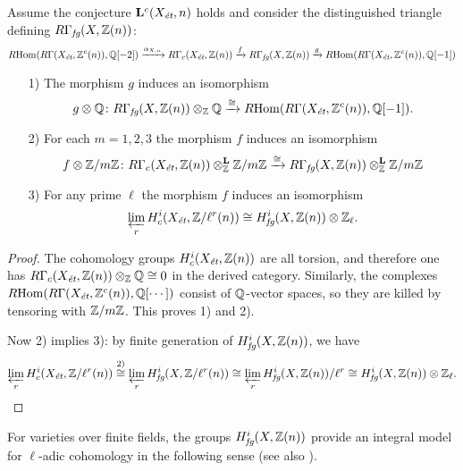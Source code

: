 \documentclass{article}
\numberwithin{equation}{section}
\begin{document}
\begin{proposition}
  \label{prop:tensoring-RGammafg-with-Z/m-and-Q}
  Assume the conjecture $\mathbf{L}^c (X_\et,n)$ holds and consider the
  distinguished triangle defining $R\Gamma_\fg (X, \ZZ (n))$:
  \[ \RHom (R\Gamma (X_\et, \ZZ^c (n)), \QQ [-2]) \xrightarrow{\alpha_{X,n}}
     R\Gamma_c (X_\et, \ZZ (n)) \xrightarrow{f}
     R\Gamma_\fg (X, \ZZ (n)) \xrightarrow{g}
     \RHom (R\Gamma (X_\et, \ZZ^c (n)), \QQ [-1]) \]

  \begin{enumerate}
  \item[1)] The morphism $g$ induces an isomorphism
    \[ g\otimes \QQ\colon R\Gamma_\fg (X, \ZZ (n)) \otimes_\ZZ \QQ \xrightarrow{\cong}
       \RHom (R\Gamma (X_\et, \ZZ^c (n)), \QQ [-1]).\]

  \item[2)] For each $m = 1,2,3$ the morphism $f$ induces an isomorphism
    \[ f\otimes \ZZ/m\ZZ\colon
       R\Gamma_c (X_\et, \ZZ (n))\otimes_\ZZ^\mathbf{L} \ZZ/m\ZZ \xrightarrow{\cong}
       R\Gamma_\fg (X, \ZZ (n))\otimes_\ZZ^\mathbf{L} \ZZ/m\ZZ \]
    
  \item[3)] For any prime $\ell$ the morphism $f$ induces an isomorphism
    $$\varprojlim_r H_c^i (X_\et, \ZZ/\ell^r (n)) \cong H_\fg^i (X, \ZZ (n)) \otimes \ZZ_\ell.$$
  \end{enumerate}
  
  \begin{proof}
    The cohomology groups $H_c^i (X_\et, \ZZ (n))$ are all torsion, and
    therefore one has $R\Gamma_c (X_\et, \ZZ (n)) \otimes_\ZZ \QQ \cong 0$ in
    the derived category. Similarly, the complexes
    $\RHom (R\Gamma (X_\et, \ZZ^c (n)), \QQ [\cdots])$ consist of $\QQ$-vector
    spaces, so they are killed by tensoring with $\ZZ/m\ZZ$.
    This proves 1) and 2).

    Now 2) implies 3): by finite generation of $H_\fg^i (X, \ZZ (n))$, we have
    \[ \varprojlim_r H_c^i (X_\et, \ZZ/\ell^r (n)) \stackrel{\text{2)}}{\cong}
      \varprojlim_r H_\fg^i (X, \ZZ/\ell^r (n)) \cong
      \varprojlim_r H_\fg^i (X, \ZZ (n))/\ell^r \cong
      H_\fg^i (X, \ZZ (n)) \otimes \ZZ_\ell. \qedhere \]
  \end{proof}
\end{proposition}

For varieties over finite fields, the groups $H_\fg^i (X, \ZZ (n))$ provide an
integral model for $\ell$-adic cohomology in the following sense
(see also \cite[\S 8]{Geisser-2004}).
\end{document}
